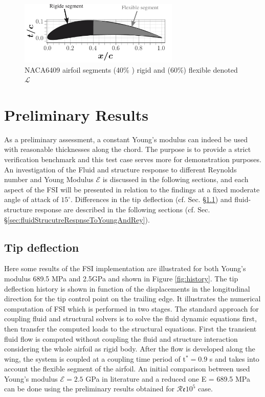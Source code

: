 \documentclass[conf]{new-aiaa}
\newcommand{\Rey}{\mathcal{R}\mathfrak{e}}
\begin{document}
%
\begin{figure}[ht!]
\centering
\includegraphics[width=3in]{figs/airfoilgeo-crop.pdf}
\caption{NACA6409 airfoil segments (40\% ) rigid and (60\%) flexible denoted $\mathcal{L}$}
\label{fig:airfoilSegments} 
\end{figure}
\section{Preliminary Results}
\label{sec:preliminary}
As a preliminary assessment, a constant Young's modulus can indeed be used with reasonable thicknesses along the chord.
%
The purpose is to provide a strict verification benchmark and this test case serves more for demonstration purposes.
%
An investigation of the Fluid and structure response to different Reynolds number and Young Modulus $\mathcal{E}$ is discussed in the following sections, and each aspect of the FSI will be presented in relation to the findings  at a fixed moderate angle of attack of $15^{\circ}$.
%
Differences in the tip deflection (cf. Sec. \S\ref{sec:deflection}) and fluid-structure response are described in the following sections (cf. Sec. \S\ref{sec:fluidStrucutreRespnseToYoungAndRey}).
\subsection{Tip deflection}
\label{sec:deflection}
Here some results of the FSI implementation are illustrated for both Young's modulus 689.5 MPa and 2.5GPa and shown in Figure \ref{fig:history}.
%
The tip deflection history is shown in function of the displacements in the longitudinal direction for the tip control point on the trailing edge.
%
It illustrates the numerical computation of FSI which is performed in two stages.
%
The standard approach for coupling fluid and structural solvers is to solve the fluid dynamic equations first, then transfer the computed loads to the structural equations.
%
First the transient fluid flow is computed without coupling the fluid and structure interaction considering the whole airfoil as rigid body.
%
After the flow is developed along the wing, the system is coupled at a coupling time period of t$^*=0.9$ s and takes into account the flexible segment of the airfoil.
%
An initial comparison between used Young's modulus $\mathcal{E}=2.5$ GPa in literature and  a reduced one E = 689.5 MPa can be done using the preliminary results obtained for $\Rey10^5$ case.
\end{document}
